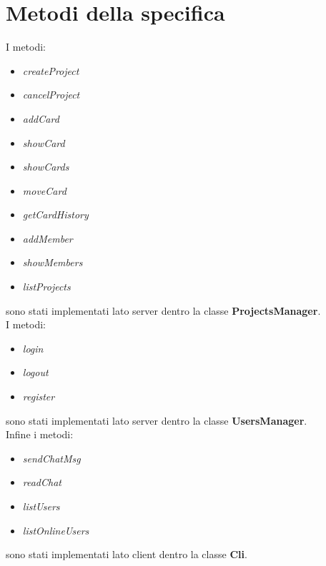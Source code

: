 \documentclass[11pt]{report}
\begin{document}
	
	\section{Metodi della specifica}
	I metodi:
		\begin{itemize}
			\item \textit{createProject}
			\item \textit{cancelProject}
			\item \textit{addCard}
			\item \textit{showCard}
			\item \textit{showCards}
			\item \textit{moveCard}
			\item \textit{getCardHistory}
			\item \textit{addMember}
			\item \textit{showMembers}
			\item \textit{listProjects}
		\end{itemize}
	sono stati implementati lato server dentro la classe \textbf{ProjectsManager}.\\
	I metodi:
		\begin{itemize}
			\item \textit{login}
			\item \textit{logout}
			\item \textit{register}
		\end{itemize}
	sono stati implementati lato server dentro la classe \textbf{UsersManager}. \\
	Infine i metodi:
		\begin{itemize}
			\item \textit{sendChatMsg}
			\item \textit{readChat}
			\item \textit{listUsers}
			\item \textit{listOnlineUsers}
		\end{itemize}
	sono stati implementati lato client dentro la classe \textbf{Cli}.
	
\end{document}
